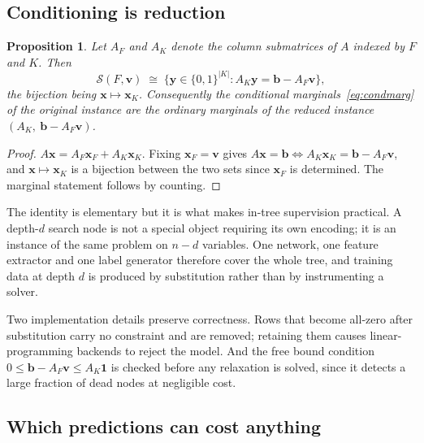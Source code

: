 \documentclass[11pt]{article}
\newtheorem{proposition}{Proposition}
\newcommand{\SOL}{\mathcal{S}}
\begin{document}
\subsection{Conditioning is reduction}
\label{sec:method-reduce}

\begin{proposition}
\label{prop:reduce}
Let $A_F$ and $A_K$ denote the column submatrices of $A$ indexed by $F$ and $K$. Then
\begin{equation}
\SOL(F,\mathbf{v}) \;\cong\; \{\mathbf{y}\in\{0,1\}^{|K|} : A_K\mathbf{y} = \mathbf{b} - A_F\mathbf{v}\},
\label{eq:reduce}
\end{equation}
the bijection being $\mathbf{x}\mapsto\mathbf{x}_K$. Consequently the conditional marginals~\eqref{eq:condmarg} of the original instance are the ordinary marginals of the reduced instance $(A_K,\ \mathbf{b}-A_F\mathbf{v})$.
\end{proposition}

\begin{proof}
$A\mathbf{x} = A_F\mathbf{x}_F + A_K\mathbf{x}_K$. Fixing $\mathbf{x}_F=\mathbf{v}$ gives $A\mathbf{x}=\mathbf{b} \iff A_K\mathbf{x}_K = \mathbf{b}-A_F\mathbf{v}$, and $\mathbf{x}\mapsto\mathbf{x}_K$ is a bijection between the two sets since $\mathbf{x}_F$ is determined. The marginal statement follows by counting.
\end{proof}

The identity is elementary but it is what makes in-tree supervision practical. A depth-$d$ search node is not a special object requiring its own encoding; it is an instance of the same problem on $n-d$ variables. One network, one feature extractor and one label generator therefore cover the whole tree, and training data at depth $d$ is produced by substitution rather than by instrumenting a solver.

Two implementation details preserve correctness. Rows that become all-zero after substitution carry no constraint and are removed; retaining them causes linear-programming backends to reject the model. And the free bound condition $0\le \mathbf{b}-A_F\mathbf{v}\le A_K\mathbf{1}$ is checked before any relaxation is solved, since it detects a large fraction of dead nodes at negligible cost.

\subsection{Which predictions can cost anything}
\label{sec:method-partition}
\end{document}
